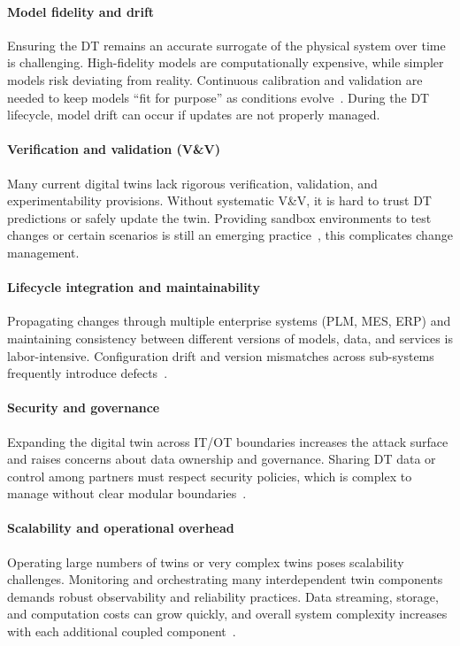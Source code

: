 \paragraph{Model fidelity and drift} Ensuring the DT remains an accurate surrogate of the physical system over time is challenging. High-fidelity models are computationally expensive, while simpler models risk deviating from reality. Continuous calibration and validation are needed to keep models “fit for purpose” as conditions evolve~\cite{zheng2020quality, wang2021assembly, Liu2024DTMMReview}. During the DT lifecycle, model drift can occur if updates are not properly managed.

\paragraph{Verification and validation (V\&V)} Many current digital twins lack rigorous verification, validation, and experimentability provisions. Without systematic V\&V, it is hard to trust DT predictions or safely update the twin. Providing sandbox environments to test changes or certain scenarios is still an emerging practice~\cite{schluse2017experimentable}, this complicates change management.

\paragraph{Lifecycle integration and maintainability} Propagating changes through multiple enterprise systems (PLM, MES, ERP) and maintaining consistency between different versions of models, data, and services is labor-intensive. Configuration drift and version mismatches across sub-systems frequently introduce defects~\cite{vrabic2018digital, shao2020framework, soori2023digital}.

\paragraph{Security and governance} Expanding the digital twin across IT/OT boundaries increases the attack surface and raises concerns about data ownership and governance. Sharing DT data or control among partners must respect security policies, which is complex to manage without clear modular boundaries~\cite{shao2019cybersecurity}.

\paragraph{Scalability and operational overhead} Operating large numbers of twins or very complex twins poses scalability challenges. Monitoring and orchestrating many interdependent twin components demands robust observability and reliability practices. Data streaming, storage, and computation costs can grow quickly, and overall system complexity increases with each additional coupled component~\cite{Liu2024DTMMReview, soori2023digital, DeanBarroso2013TailAtScale}.


